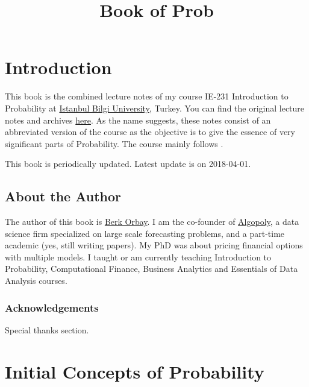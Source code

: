 \documentclass[]{book}
\title{Book of Prob}
\author{}
\date{}
\theoremstyle{definition}
\theoremstyle{definition}
\theoremstyle{definition}
\theoremstyle{remark}
\begin{document}
\maketitle

{
\setcounter{tocdepth}{1}
\tableofcontents
}
\hypertarget{introduction}{%
\chapter*{Introduction}\label{introduction}}

This book is the combined lecture notes of my course IE-231 Introduction
to Probability at \href{https://www.bilgi.edu.tr}{Istanbul Bilgi
University}, Turkey. You can find the original lecture notes and
archives \href{https://berkorbay.github.io/bilgi-ie231/}{here}. As the
name suggests, these notes consist of an abbreviated version of the
course as the objective is to give the essence of very significant parts
of Probability. The course mainly follows \citep{myers2012}.

This book is periodically updated. Latest update is on 2018-04-01.

\hypertarget{about-the-author}{%
\section*{About the Author}\label{about-the-author}}

The author of this book is \href{http://berkorbay.me}{Berk Orbay}. I am
the co-founder of \href{http://algopoly.com}{Algopoly}, a data science
firm specialized on large scale forecasting problems, and a part-time
academic (yes, still writing papers). My PhD was about pricing financial
options with multiple models. I taught or am currently teaching
Introduction to Probability, Computational Finance, Business Analytics
and Essentials of Data Analysis courses.

\hypertarget{acknowledgements}{%
\subsection*{Acknowledgements}\label{acknowledgements}}

Special thanks section.

\hypertarget{intro}{%
\chapter{Initial Concepts of Probability}\label{intro}}
\end{document}
